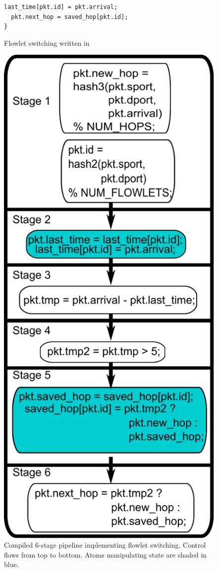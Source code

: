 \begin{figure}[!t]
\begin{minipage}{0.6\textwidth}
\begin{small}
\begin{lstlisting}[style=customc]
  last_time[pkt.id] = pkt.arrival;
  pkt.next_hop = saved_hop[pkt.id];
}
\end{lstlisting}
\end{small}
\caption{Flowlet switching written in \pktlanguage}
\label{fig:flowlet_code}
\end{minipage}
%
\vrule\quad
%
\begin{minipage}{0.4\textwidth}
\includegraphics[width=0.8\columnwidth]{pipe.pdf}
\caption{Compiled 6-stage \absmachine pipeline implementing flowlet
switching.  Control flows from top to bottom. Atoms manipulating state are
shaded in blue.}
\label{fig:flowlet_pipeline}
\end{minipage}
\end{figure}

